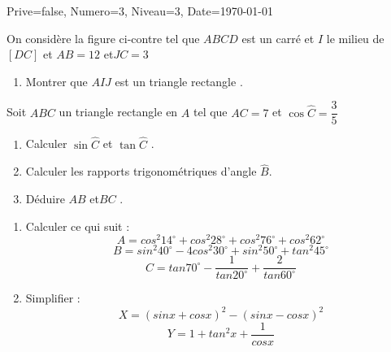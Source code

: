 \documentclass[a4paper,12pt]{article}
\begin{document}
\begin{Maquette}[DM]{Prive=false, Numero=3, Niveau=3, Date=\today}

\begin{exercice}
\begin{minipage}{0.6\linewidth}
On considère la figure ci-contre tel que $ABCD$ est un  carré  et $I$ le milieu de $[DC]$ et $AB=12$ et$JC=3$
\begin{enumerate}
\item Montrer que $AIJ$ est un triangle rectangle .
\end{enumerate}
\end{minipage}
\begin{minipage}{0.4\linewidth}
\end{minipage}
\end{exercice}

\begin{exercice}

Soit  $ABC$ un triangle rectangle en $A$ tel que  $AC=7$ et $\cos \widehat{C}=\dfrac{3}{5}$
\begin{enumerate}
\item Calculer  $\sin \widehat{C}$ et $\tan \widehat{C}$ .
\item Calculer les rapports trigonométriques d'angle $\widehat{B}$.
\item Déduire $AB$ et$BC$ .
\end{enumerate}
\end{exercice}

\begin{exercice}
\begin{enumerate}
\item Calculer ce qui suit :
$$A= cos^{2}14^{\circ}+cos^{2}28^{\circ}+cos^{2}76^{\circ}+cos^{2}62^{\circ}$$
$$B=sin^{2}40^{\circ}-4cos^{2}30^{\circ}+sin^{2}50^{\circ}+tan^{2}45^{\circ}$$
$$C=tan70^{\circ}-\dfrac{1}{tan20^{\circ}}+\dfrac{2}{tan60^{\circ}}$$
\item Simplifier :
$$ X=(sinx+cosx)^{2}-(sinx-cosx)^{2} $$
$$ Y=1+tan^{2}x+\dfrac{1}{cosx}$$
\end{enumerate}


\end{exercice}
\end{Maquette}
\end{document}
